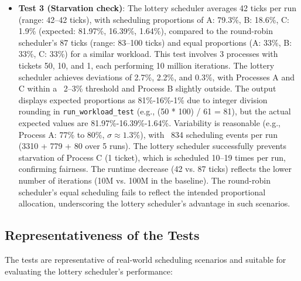 \documentclass{article}
\begin{document}
\begin{itemize}
    \item \textbf{Test 3 (Starvation check)}: The lottery scheduler averages 42 ticks per run (range: 42–42 ticks), with scheduling proportions of A: 79.3\%, B: 18.6\%, C: 1.9\% (expected: 81.97\%, 16.39\%, 1.64\%), compared to the round-robin scheduler’s 87 ticks (range: 83–100 ticks) and equal proportions (A: 33\%, B: 33\%, C: 33\%) for a similar workload. This test involves 3 processes with tickets 50, 10, and 1, each performing 10 million iterations. The lottery scheduler achieves deviations of 2.7\%, 2.2\%, and 0.3\%, with Processes A and C within a ~2–3\% threshold and Process B slightly outside. The output displays expected proportions as 81\%-16\%-1\% due to integer division rounding in \texttt{run\_workload\_test} (e.g., (50 * 100) / 61 = 81), but the actual expected values are 81.97\%-16.39\%-1.64\%. Variability is reasonable (e.g., Process A: 77\% to 80\%, $\sigma \approx 1.3\%$), with ~834 scheduling events per run (3310 + 779 + 80 over 5 runs). The lottery scheduler successfully prevents starvation of Process C (1 ticket), which is scheduled 10–19 times per run, confirming fairness. The runtime decrease (42 vs. 87 ticks) reflects the lower number of iterations (10M vs. 100M in the baseline). The round-robin scheduler’s equal scheduling fails to reflect the intended proportional allocation, underscoring the lottery scheduler’s advantage in such scenarios.
\end{itemize}

\subsection{Representativeness of the Tests}
The tests are representative of real-world scheduling scenarios and suitable for evaluating the lottery scheduler’s performance:
\end{document}
